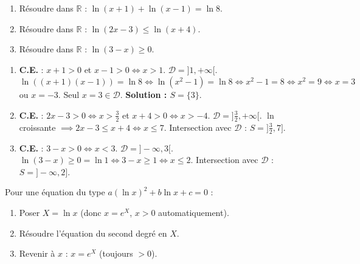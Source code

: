\documentclass[11pt]{article}
\begin{document}
\begin{exoresolu}
\begin{enumerate}
\item Résoudre dans $\mathbb{R}$ : $\ln(x+1)+\ln(x-1)=\ln 8$.
\item Résoudre dans $\mathbb{R}$ : $\ln(2x-3)\leq \ln(x+4)$.
\item Résoudre dans $\mathbb{R}$ : $\ln(3-x) \geq 0$.
\end{enumerate}
\tcblower
\begin{enumerate}
\item \textbf{C.E.} : $x+1>0$ et $x-1>0 \iff x>1$. $\mathcal{D}=]1,+\infty[$.
   $\ln((x+1)(x-1))=\ln 8 \iff \ln(x^2-1)=\ln 8 \iff x^2-1=8 \iff x^2=9 \iff x=3$ ou $x=-3$.
   Seul $x=3 \in \mathcal{D}$. \textbf{Solution : $S=\{3\}$}.
\item \textbf{C.E.} : $2x-3>0 \iff x>\frac{3}{2}$ et $x+4>0 \iff x>-4$. $\mathcal{D}=]\frac{3}{2},+\infty[$.
   $\ln$ croissante $\implies 2x-3 \le x+4 \iff x \le 7$.
   Intersection avec $\mathcal{D}$ : \textbf{$S=]\frac{3}{2}, 7]$}.
\item \textbf{C.E.} : $3-x>0 \iff x<3$. $\mathcal{D}=]-\infty,3[$.
   $\ln(3-x) \ge 0 = \ln 1 \iff 3-x \ge 1 \iff x \le 2$.
   Intersection avec $\mathcal{D}$ : \textbf{$S=]-\infty, 2]$}.
\end{enumerate}
\end{exoresolu}

\begin{methode}[Changement d'inconnue $X=\ln x$]
Pour une équation du type $a(\ln x)^2 + b\ln x + c = 0$ :
\begin{enumerate}
\item Poser $X=\ln x$ (donc $x=e^X$, $x>0$ automatiquement).
\item Résoudre l'équation du second degré en $X$.
\item Revenir à $x$ : $x=e^X$ (toujours $>0$).
\end{enumerate}
\end{methode}
\end{document}
